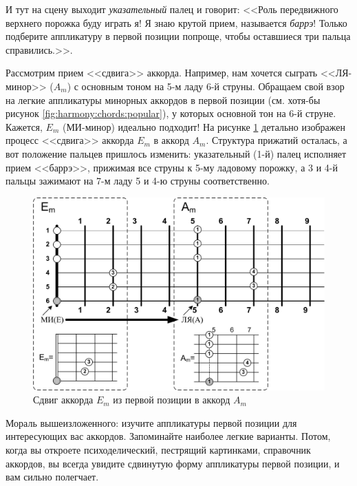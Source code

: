 И тут на сцену выходит \emph{указательный} палец и говорит: <<Роль передвижного верхнего порожка буду играть я! Я знаю крутой прием, называется \emph{баррэ}! Только подберите аппликатуру в первой позиции попроще, чтобы оставшиеся три пальца справились.>>.

Рассмотрим прием <<сдвига>> аккорда. Например, нам хочется сыграть <<ЛЯ-минор>> ($A_m$) с основным тоном на 5-м ладу 6-й струны. Обращаем свой взор на легкие аппликатуры минорных аккордов в первой позиции (см. хотя-бы рисунок \ref{fig:harmony:chords:popular}), у которых основной тон на 6-й струне. Кажется, $E_m$ (МИ-минор) идеально подходит! На рисунке \ref{fig:harmony:chords:shift} детально изображен процесс <<сдвига>> аккорда $E_m$ в аккорд $A_m$. Структура прижатий осталась, а вот положение пальцев пришлось изменить: указательный (1-й) палец исполняет прием <<баррэ>>, прижимая все струны к 5-му ладовому порожку, а 3 и 4-й пальцы зажимают на 7-м ладу 5 и 4-ю струны соответственно. 

\begin{figure}[!ht]
    \centering
    \includegraphics[width=\textwidth]{fig/chords/shift} 
    \caption{Сдвиг аккорда $E_m$ из первой позиции в аккорд $A_m$}\label{fig:harmony:chords:shift}
\end{figure} 

Мораль вышеизложенного: изучите аппликатуры первой позиции для интересующих вас аккордов. Запоминайте наиболее легкие варианты. Потом, когда вы откроете психоделический, пестрящий картинками, справочник аккордов, вы всегда увидите сдвинутую форму аппликатуры первой позиции, и вам сильно полегчает.


